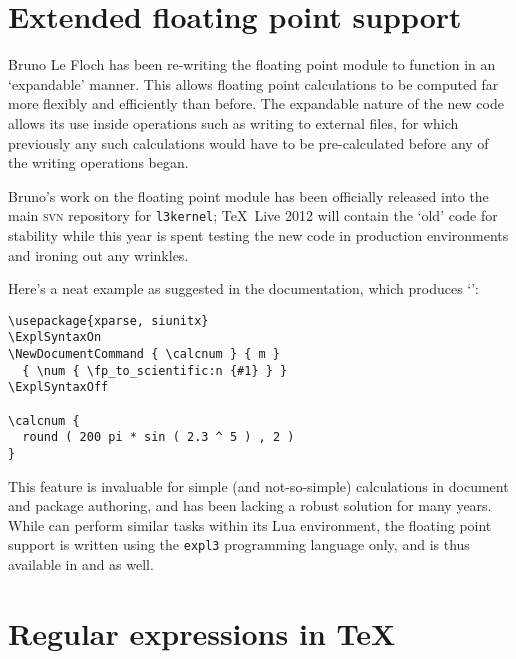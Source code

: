 \documentclass{ltnews}
\begin{document}
\maketitle

\raisefirstsection
\section{Extended floating point support}

Bruno Le Floch has been re-writing the floating point module to function in an `expandable' manner. This allows floating point calculations to be computed far more flexibly and efficiently than before.
The expandable nature of the new code allows its use inside operations such as writing to external files, for which previously any such calculations would have to be pre-calculated before any of the writing operations began.

Bruno's work on the floating point module has been officially released into the main \textsc{svn} repository for \texttt{l3kernel}; \TeX\ Live 2012 will contain the `old' code for stability while this year is spent testing the new code in production environments and ironing out any wrinkles.

Here's a neat example as suggested in the documentation, which produces `':

\begin{verbatim}
\usepackage{xparse, siunitx} 
\ExplSyntaxOn
\NewDocumentCommand { \calcnum } { m }
  { \num { \fp_to_scientific:n {#1} } }
\ExplSyntaxOff

\calcnum {
  round ( 200 pi * sin ( 2.3 ^ 5 ) , 2 )
}
\end{verbatim}

This feature is invaluable for simple (and not-so-simple) calculations in document and package authoring, and has been lacking a robust solution for many years.
While  can perform similar tasks within its Lua environment, the floating point support is written using the \texttt{expl3} programming language only, and is thus available in  and  as well.

\section{Regular expressions in \TeX}
\end{document}
